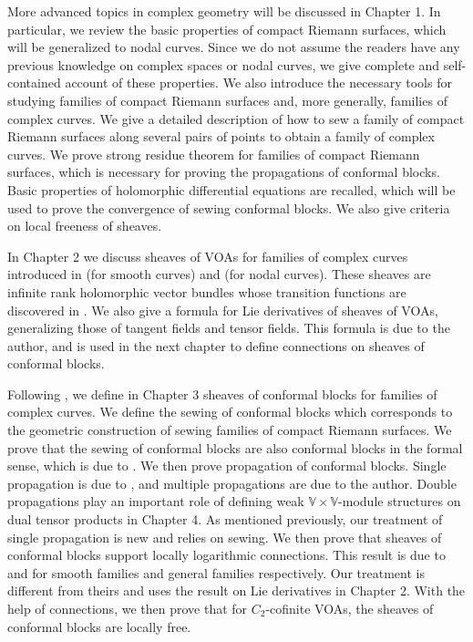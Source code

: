 \documentclass[12pt,b5paper,notitlepage]{report}
\theoremstyle{definition}
\theoremstyle{plain}
\newcommand{\Vbb}{\mathbb V}
\numberwithin{equation}{section}
\begin{document}
More advanced topics in complex geometry will be discussed in Chapter 1. In particular, we review the basic properties of compact Riemann surfaces, which will be generalized to nodal curves. Since we do not assume the readers have any previous knowledge on complex spaces or nodal curves, we give complete and self-contained account of these properties. We also introduce the necessary tools for studying families of compact Riemann surfaces and, more generally, families of complex curves. We  give a detailed description of how to sew a family of compact Riemann surfaces along several pairs of points to obtain a family of complex curves. We prove strong residue theorem for families of compact Riemann surfaces, which is necessary for proving the propagations of conformal blocks. Basic properties of holomorphic differential equations are recalled, which will be used to prove the convergence of sewing conformal blocks. We also give criteria on local freeness of sheaves.

In Chapter 2 we discuss sheaves of VOAs for families of complex curves introduced in \cite{FB04} (for smooth curves) and \cite{DGT19a} (for nodal curves). These sheaves are infinite rank holomorphic vector bundles whose transition functions are discovered in \cite{Hua97}. We also give a formula for Lie derivatives of sheaves of VOAs, generalizing those of tangent fields and tensor fields. This formula is due to the author, and is used in the next chapter to define connections on sheaves of conformal blocks.

Following \cite{FB04,DGT19a}, we define in Chapter 3 sheaves of conformal blocks for families of complex curves. We define the sewing of conformal blocks which corresponds to the geometric construction of sewing families of compact Riemann surfaces. We prove that the sewing of conformal blocks are also conformal blocks in the formal sense, which is due to \cite{DGT19b}. We then prove  propagation of conformal blocks. Single propagation is due to \cite{FB04}, and multiple propagations are due to the author. Double propagations play an important role of defining weak $\Vbb\times\Vbb$-module structures on dual tensor products in Chapter 4. As mentioned previously, our treatment of single propagation is new and relies on sewing. We then prove that sheaves of conformal blocks support locally logarithmic connections. This result is due to \cite{FB04} and \cite{DGT19a} for smooth families and general families respectively. Our treatment is different from theirs and uses the result on Lie derivatives in Chapter 2. With the help of connections, we then prove that for $C_2$-cofinite VOAs, the sheaves of conformal blocks are locally free.
\end{document}
